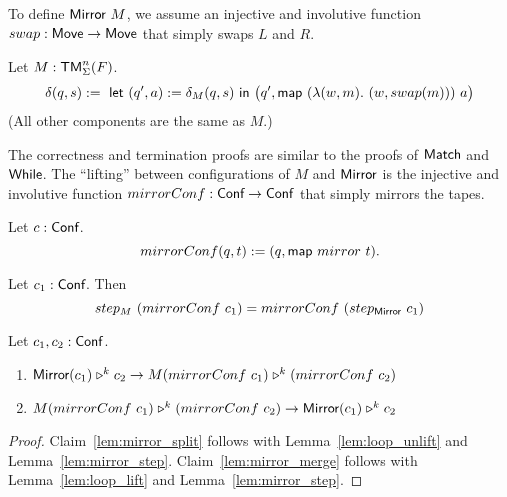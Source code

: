 To define $\MS{Mirror}~M$, we assume an injective and involutive function $swap:\textsf{Move} \rightarrow \textsf{Move}$ that simply swaps $L$ and $R$.

\begin{definition}[$\MS{Mirror}~M$]
  \label{def:Mirror}
  Let $M:\textsf{TM}_\Sigma^n(F)$.
  \[
    \delta(q, s) :=~
    \textsf{let}~(q', a) := \delta_M(q,s)~\textsf{in}~\bigl(q', \textsf{map}~(\lambda(w, m).~(w, swap(m)))~a \bigr)
  \]
  (All other components are the same as $M$.)
\end{definition}

The correctness and termination proofs are similar to the proofs of $\textsf{Match}$ and $\textsf{While}$.  The ``lifting'' between configurations of $M$ and
$\textsf{Mirror}$ is the injective and involutive function $mirrorConf : \textsf{Conf} \rightarrow \textsf{Conf}$ that simply mirrors the tapes.

\begin{definition}
  \label{def:mirrorConf}
  Let $c : \textsf{Conf}$.
  \[ mirrorConf(q,t) := (q, \textsf{map}~mirror~t). \]
\end{definition}


\begin{lemma}
  \label{lem:mirror_step}
  Let $c_1 : \textsf{Conf}$.  Then
  \[ step_M~(mirrorConf~c_1) = mirrorConf~(step_{\textsf{Mirror}}~c_1) \]
\end{lemma}

\begin{lemma}
  \label{lem:mirror_loop}
  Let $c_1, c_2 : \textsf{Conf}$.
  \begin{enumerate}
  \item \label{lem:mirror_split}
    $ \textsf{Mirror} (c_1) \mathrel{\triangleright}^k c_2 \rightarrow M (mirrorConf~c_1) \mathrel{\triangleright}^k (mirrorConf~c_2) $
  \item \label{lem:mirror_merge}
    $ M (mirrorConf~c_1) \mathrel{\triangleright}^k (mirrorConf~c_2) \rightarrow \textsf{Mirror} (c_1) \mathrel{\triangleright}^k c_2 $
  \end{enumerate}
\end{lemma}
\begin{proof}
  Claim~\ref{lem:mirror_split} follows with Lemma~\ref{lem:loop_unlift} and Lemma~\ref{lem:mirror_step}.  Claim~\ref{lem:mirror_merge} follows with
  Lemma~\ref{lem:loop_lift} and Lemma~\ref{lem:mirror_step}.
\end{proof}

